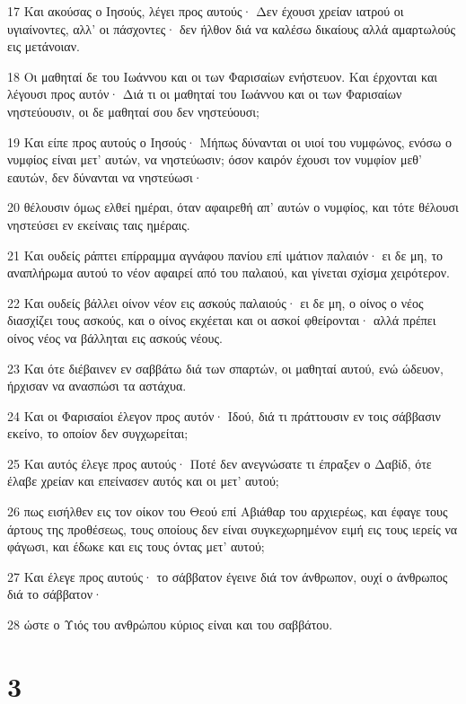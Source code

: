 \par 17 Και ακούσας ο Ιησούς, λέγει προς αυτούς· Δεν έχουσι χρείαν ιατρού οι υγιαίνοντες, αλλ' οι πάσχοντες· δεν ήλθον διά να καλέσω δικαίους αλλά αμαρτωλούς εις μετάνοιαν.
\par 18 Οι μαθηταί δε του Ιωάννου και οι των Φαρισαίων ενήστευον. Και έρχονται και λέγουσι προς αυτόν· Διά τι οι μαθηταί του Ιωάννου και οι των Φαρισαίων νηστεύουσιν, οι δε μαθηταί σου δεν νηστεύουσι;
\par 19 Και είπε προς αυτούς ο Ιησούς· Μήπως δύνανται οι υιοί του νυμφώνος, ενόσω ο νυμφίος είναι μετ' αυτών, να νηστεύωσιν; όσον καιρόν έχουσι τον νυμφίον μεθ' εαυτών, δεν δύνανται να νηστεύωσι·
\par 20 θέλουσιν όμως ελθεί ημέραι, όταν αφαιρεθή απ' αυτών ο νυμφίος, και τότε θέλουσι νηστεύσει εν εκείναις ταις ημέραις.
\par 21 Και ουδείς ράπτει επίρραμμα αγνάφου πανίου επί ιμάτιον παλαιόν· ει δε μη, το αναπλήρωμα αυτού το νέον αφαιρεί από του παλαιού, και γίνεται σχίσμα χειρότερον.
\par 22 Και ουδείς βάλλει οίνον νέον εις ασκούς παλαιούς· ει δε μη, ο οίνος ο νέος διασχίζει τους ασκούς, και ο οίνος εκχέεται και οι ασκοί φθείρονται· αλλά πρέπει οίνος νέος να βάλληται εις ασκούς νέους.
\par 23 Και ότε διέβαινεν εν σαββάτω διά των σπαρτών, οι μαθηταί αυτού, ενώ ώδευον, ήρχισαν να ανασπώσι τα αστάχυα.
\par 24 Και οι Φαρισαίοι έλεγον προς αυτόν· Ιδού, διά τι πράττουσιν εν τοις σάββασιν εκείνο, το οποίον δεν συγχωρείται;
\par 25 Και αυτός έλεγε προς αυτούς· Ποτέ δεν ανεγνώσατε τι έπραξεν ο Δαβίδ, ότε έλαβε χρείαν και επείνασεν αυτός και οι μετ' αυτού;
\par 26 πως εισήλθεν εις τον οίκον του Θεού επί Αβιάθαρ του αρχιερέως, και έφαγε τους άρτους της προθέσεως, τους οποίους δεν είναι συγκεχωρημένον ειμή εις τους ιερείς να φάγωσι, και έδωκε και εις τους όντας μετ' αυτού;
\par 27 Και έλεγε προς αυτούς· το σάββατον έγεινε διά τον άνθρωπον, ουχί ο άνθρωπος διά το σάββατον·
\par 28 ώστε ο Υιός του ανθρώπου κύριος είναι και του σαββάτου.

\chapter{3}

